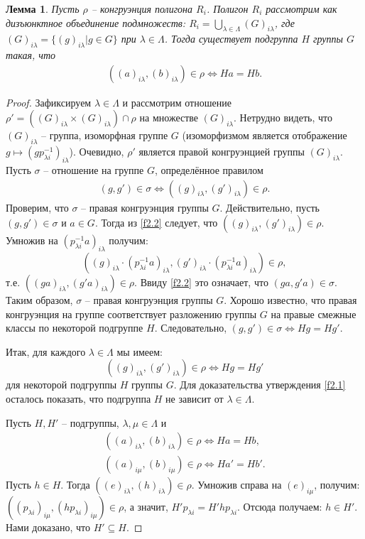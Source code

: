 \documentclass[a4paper]{article}
\newtheorem{lemma}{Лемма}
\begin{document}
	\begin{lemma} \label{l2.3}
		Пусть $\rho$ -- конгруэнция полигона $R_i$. Полигон $R_i$ рассмотрим как дизъюнктное объединение подмножеств: $R_i = \bigcup_{\lambda \in \Lambda}(G)_{i \lambda}$, где $(G)_{i \lambda} = \{ (g)_{i \lambda} | g \in G \}$ при $\lambda \in \Lambda$. Тогда существует подгруппа $H$ группы $G$ такая, что 
		\begin{gather} 
			((a)_{i \lambda},(b)_{i \lambda}) \in \rho \Leftrightarrow Ha = Hb. \label{f2.1}
		\end{gather}
	\end{lemma}
	\begin{proof}
		Зафиксируем $\lambda \in \Lambda$ и рассмотрим отношение $\rho' = ((G)_{i \lambda} \times (G)_{i \lambda}) \cap \rho$ на множестве $(G)_{i \lambda}$. Нетрудно видеть, что $(G)_{i \lambda}$ -- группа, изоморфная группе $G$ (изоморфизмом является отображение $g \mapsto (g p_{\lambda i}^{-1})_{i \lambda}$). Очевидно, $\rho'$ является правой конгруэнцией группы $(G)_{i \lambda}$. Пусть $\sigma$ -- отношение на группе $G$, определённое правилом 
		\begin{gather}
			(g,g') \in \sigma \Leftrightarrow ((g)_{i \lambda},(g')_{i \lambda}) \in \rho. \label{f2.2}
		\end{gather}
		Проверим, что $\sigma$ -- правая конгруэнция группы $G$. Действительно, пусть $(g,g') \in \sigma$ и $a \in G$. Тогда из \ref{f2.2} следует, что $((g)_{i \lambda},(g')_{i \lambda}) \in \rho$. Умножив на $(p_{\lambda i}^{-1} a)_{i \lambda}$ получим: $$ ((g)_{i \lambda} \cdot (p_{\lambda i}^{-1} a)_{i \lambda},(g')_{i \lambda} \cdot (p_{\lambda i}^{-1} a)_{i \lambda}) \in \rho, $$ т.е. $ ((g a)_{i \lambda},(g' a)_{i \lambda}) \in \rho $. Ввиду \ref{f2.2} это означает, что $(ga,g'a) \in \sigma$. Таким образом, $\sigma$ -- правая конгруэнция группы $G$. Хорошо известно, что правая конгруэнция на группе соответствует разложению группы $G$ на правые смежные классы по некоторой подгруппе $H$. Следовательно, $(g,g') \in \sigma \Leftrightarrow Hg = Hg'$.
		\par Итак, для каждого $\lambda \in \Lambda$ мы имеем: $$ ((g)_{i \lambda},(g')_{i \lambda}) \in \rho \Leftrightarrow Hg = Hg' $$ для некоторой подгруппы $H$ группы $G$. Для доказательства утверждения \ref{f2.1} осталось показать, что подгруппа $H$ не зависит от $\lambda \in \Lambda$.
		\par Пусть $H,H'$ -- подгруппы, $\lambda,\mu \in \Lambda$ и 
		\begin{gather*}
			((a)_{i \lambda},(b)_{i \lambda}) \in \rho \Leftrightarrow Ha = Hb, \\
			((a)_{i \mu},(b)_{i \mu}) \in \rho \Leftrightarrow Ha' = Hb'.
		\end{gather*}
		Пусть $h \in H$. Тогда $((e)_{i \lambda},(h)_{i \lambda}) \in \rho$. Умножив справа на $(e)_{i \mu}$, получим: $((p_{\lambda i})_{i \mu}, (h p_{\lambda i})_{i \mu}) \in \rho$, а значит, $H' p_{\lambda i} = H' h p_{\lambda i}$. Отсюда получаем: $h \in H'$. Нами доказано, что $H' \subseteq H$.
	\end{proof}
	
\end{document}
